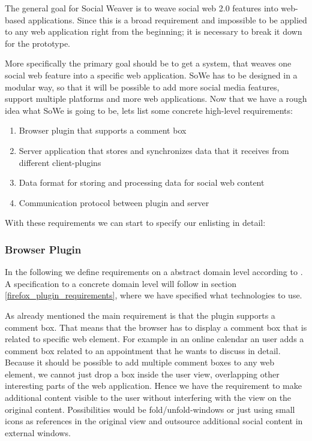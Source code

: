 The general goal for Social Weaver is to weave social web 2.0 features into web-based applications. Since this is a broad requirement and impossible to be applied to any web application right from the beginning; it is necessary to break it down for the prototype.

More specifically the primary goal should be to get a system, that weaves one social web feature into a specific web application. SoWe has to be designed in a modular way, so that it will be possible to add more social media features, support multiple platforms and more web applications. Now that we have a rough idea what SoWe is going to be, lets list some concrete high-level requirements:

\begin{enumerate}
\item Browser plugin that supports a comment box
\item Server application that stores and synchronizes data that it receives from different client-plugins
\item Data format for storing and processing data for social web content
\item Communication protocol between plugin and server
\end{enumerate}

With these requirements we can start to specify our enlisting in detail:

\subsubsection{Browser Plugin}\label{browser_plugin}
In the following we define requirements on a abstract domain level according to \cite{van2009requirements}. A specification to a concrete domain level will follow in section \ref{firefox_plugin_requirements}, where we have specified what technologies to use.

As already mentioned the main requirement is that the plugin supports a comment box. That means that the browser has to display a comment box that is related to specific web element. For example in an online calendar an user adds a comment box related to an appointment that he wants to discuss in detail. 
Because it should be possible to add multiple comment boxes to any web element, we cannot just drop a box inside the user view, overlapping other interesting parts of the web application. Hence we have the requirement to make additional content visible to the user without interfering with the view on the original content. Possibilities would be fold/unfold-windows or just using small icons as references in the original view and outsource additional social content in external windows.

